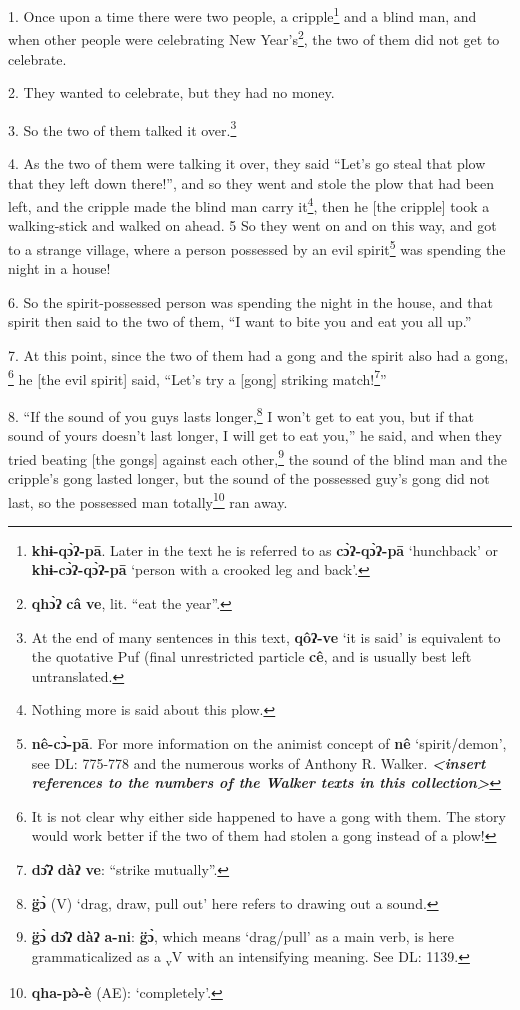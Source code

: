 \setcounter{footnote}{0}

1. Once upon a time there were two people, a cripple\footnote{\textbf{khɨ-qɔ̀ʔ-pā}. Later in the text he is referred to as \textbf{cɔ̀ʔ-qɔ̀ʔ-pā} `hunchback' or \textbf{khɨ-cɔ̀ʔ-qɔ̀ʔ-pā} `person with a crooked leg and back'.} and a blind man, and when
other people were celebrating New Year's\footnote{\textbf{qhɔ̀ʔ} \textbf{câ} \textbf{ve}, lit. ``eat the year''.}, the two of them did not get to celebrate.

2. They wanted to celebrate, but they had no money.

3. So the two of them talked it over.\footnote{At the end of many sentences in this text, \textbf{qôʔ-ve} `it is said' is equivalent to the quotative Puf (final unrestricted particle \textbf{cê}, and is usually best left untranslated.}

4. As the two of them were talking it over, they said ``Let's go steal that plow
that they left down there!'', and so they went and stole the plow that had been
left, and the cripple made the blind man carry it\footnote{Nothing more is said about this plow.}, then he [the cripple] took
a walking-stick and walked on ahead. 5 So they went on and on this way, and got
to a strange village, where a person possessed by an evil spirit\footnote{\textbf{nê-cɔ̀-pā}. For more information on the animist concept of \textbf{nê} `spirit/demon', see DL: 775-778 and the numerous works of Anthony R. Walker. \textit{\textbf{<insert references to the numbers of the Walker texts in this collection>}}} was spending
the night in a house!

6. So the spirit-possessed person was spending the night in the house, and that
spirit then said to the two of them, ``I want to bite you and eat you all up.''

7. At this point, since the two of them had a gong and the spirit also had a gong,
\footnote{It is not clear why either side happened to have a gong with them. The story would work better if the two of them had stolen a gong instead of a plow!} he [the evil spirit] said, ``Let's try a [gong] striking match!\footnote{\textbf{dɔ̂ʔ} \textbf{dàʔ} \textbf{ve}: ``strike mutually''.}''

8. ``If the sound of you guys lasts longer,\footnote{\textbf{g̈ɔ̀} (V) `drag, draw, pull out' here refers to drawing out a sound.} I won't get to eat you,
but if that sound of yours doesn't last longer, I will get to eat you,'' he said,
and when they tried beating [the gongs] against each other,\footnote{\textbf{g̈ɔ̀} \textbf{dɔ̂ʔ} \textbf{dàʔ} \textbf{a-ni}: \textbf{g̈ɔ̀}, which means `drag/pull' as a main verb, is here grammaticalized as a \textsubscript{v}V with an intensifying meaning. See DL: 1139.} the sound of the
blind man and the cripple's gong lasted longer, but the sound of the possessed
guy's gong did not last, so the possessed man totally\footnote{\textbf{qha-pə̀-è} (AE): `completely'.} ran away.

